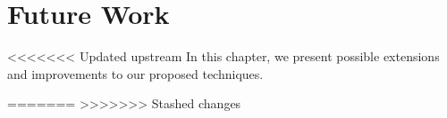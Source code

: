 \chapter{Future Work}
\label{chap:futurework}

<<<<<<< Updated upstream
In this chapter, we present possible extensions and improvements to our proposed techniques.

=======
>>>>>>> Stashed changes
\lipsum

